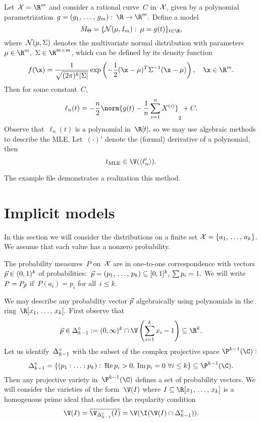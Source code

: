 \documentclass{article}
\begin{document}
  \begin{example}
    Let~\(\XX = \R^m\) and consider a rational curve~\(C\) in~\(\mathcal{X}\), given by a polynomial parametrization~\(g = (g_1,\,\ldots,\,g_m):\:\R \to \R^m.\) Define a model
    \[
      M_\Theta = \{\ND(\mu,I_m):\:\mu = g(t)\}_{t\in \R},
    \]
    where~\(\mathcal{N}(\mu,\Sigma)\) denotes the multivariate normal distribution with parameters~\(\mu \in \R^m,\) \(\Sigma \in \R^{m\times m}\), which can be defined by its density function
    \[
      f(\x) = \frac{1}{\sqrt{(2\pi)^k |\Sigma|}}  \exp\left(-\frac{1}{2} (\x - \mu)^T \Sigma^{-1} (\x - \mathbf{\mu})\right),\quad \x \in \R^m.
    \]
    Then for some constant~\(C,\)
    \[
      \ell_n(t) = -\frac{n}{2}\norm{g(t) - \frac{1}{n}\sum_{i=1}^n \X{i}}_2 + C.
    \]
    Observe that~\(\ell_n(t)\) is a polynomial in~\(\R[t],\) so we may use algebraic methods to describe the MLE. Let~\((\cdot)'\) denote the (formal) derivative of a polynomial, then
    \[
      \mle[t] \in \V(\langle \ell_n'\rangle).
    \] 

    The example file  demonstrates a realization this method.
  \end{example}
  \section{Implicit models}
  In this section we will consider the distributions on a finite set \(\mathcal{X} = \{a_1,\,\ldots,\,a_k\}\). We assume that each value has a nonzero probability. 

  The probability measures~\(P\) on~\(\mathcal{X}\) are in one-to-one correspondence with vectors \(\vec p \in (0,1)^k\) of probabilities:~\(\vec p = (p_1,\,\ldots,\,p_k) \subseteq [0,1]^k,\,\sum p_i = 1.\) We will write~\(P = P_{\vec p}\) if~\(P(a_i) = p_i\) for all~\(i \le k.\)
 
  We may describe any probability vector \(\vec p\) algebraically using polynomials in the ring~\(\R[x_1,\,\ldots,\,x_k].\) First observe that 
  \[
    \p \in \od_{k-1} := (0,\infty)^k \cap \V\left(\sum_{i=1}^k x_i - 1\right) \subseteq \R^k.
  \]
  Let us identify~\(\Delta^\circ_{k-1}\) with the subset of the complex projective space \(\P^{k-1}(\C):\)
  \[
    \od_{k-1} = \{(p_1:\ldots:p_k):\:\Re p_i >0,\,\Im p_i = 0\ \forall i \le k\} \subseteq \P^{k-1}(\C).
  \]
  Then any projective variety in~\(\P^{k-1}(\C)\) defines a set of probability vectors. We will consider the varieties of the form~\(\V(I)\) where \(I \subseteq \R[x_1,\,\ldots,\,x_k]\)  is a  homogenous prime ideal that satisfies the reqularity condition
  \begin{equation}\label{eq:regularity}
    \V(I) = \overline{\V_{\od_{k-1}}(I)} =  \V(\I(\V(I)\cap \od_{k-1})).
  \end{equation}
\end{document}
